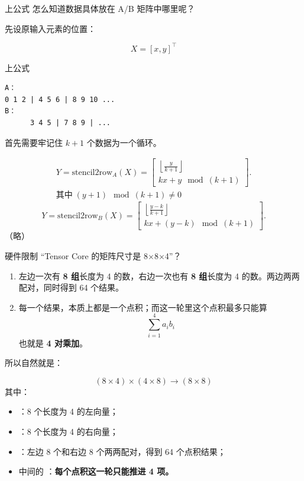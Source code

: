 \documentclass[aspectratio=169,10pt]{beamer}
\begin{document}
\begin{frame}[fragile]{上公式}
怎么知道数据具体放在 A/B 矩阵中哪里呢？
\par
先设原输入元素的位置：
\par
\[
X=[x,y]^\top
\]
\end{frame}

\begin{frame}[fragile]{上公式}
\begin{Verbatim}[fontsize=\small]
A：
0 1 2 | 4 5 6 | 8 9 10 ...
B：
      3 4 5 | 7 8 9 | ...
\end{Verbatim}
首先需要牢记住 $k+1$ 个数据为一个循环。
\par
\[
\begin{aligned}
Y = \text{stencil2row}_A(X) =
\begin{bmatrix}
\left\lfloor \frac{y}{k+1} \right\rfloor \\
kx + y \mod (k+1)
\end{bmatrix}.
\\
其中\;(y+1)\mod (k+1)\ne 0
\end{aligned}
\]
\[
Y = \text{stencil2row}_B(X) =
\begin{bmatrix}
\left\lfloor \frac{y-k}{k+1} \right\rfloor \\
kx + (y-k) \mod (k+1)
\end{bmatrix}.
\]
（略）
\par
\end{frame}

\begin{frame}[fragile]{硬件限制}
“Tensor Core 的矩阵尺寸是 8\ensuremath{\times}8\ensuremath{\times}4”？
\par
\begin{enumerate}
\item 左边一次有 \textbf{8 组}长度为 4 的数，右边一次也有 \textbf{8 组}长度为 4 的数。两边两两配对，同时得到 64 个结果。
\item 每一个结果，本质上都是一个点积；而这一轮里这个点积最多只能算
\[
\sum_{i=1}^{4} a_i b_i
\]
也就是 \textbf{4 对乘加}。
\end{enumerate}
所以自然就是：
\par
\[
(8\times4)\times(4\times8)\rightarrow(8\times8)
\]
其中：
\par
\begin{itemize}
\item \texttt{}：8 个长度为 4 的左向量；
\item \texttt{}：8 个长度为 4 的右向量；
\item \texttt{}：左边 8 个和右边 8 个两两配对，得到 64 个点积结果；
\item 中间的 \texttt{}：\textbf{每个点积这一轮只能推进 4 项。}
\end{itemize}
\end{frame}
\end{document}
